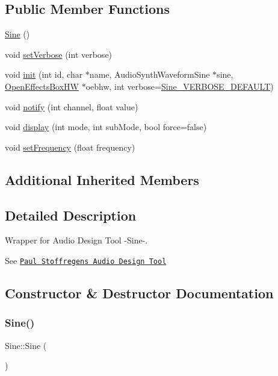 \subsection*{Public Member Functions}
\begin{DoxyCompactItemize}
\item 
\mbox{\hyperlink{class_sine_ac6f77168f7f50d200dc4b2d222c00608}{Sine}} ()
\item 
void \mbox{\hyperlink{class_sine_a84981bef49077a86ec953298d9e3e1d1}{set\+Verbose}} (int verbose)
\item 
void \mbox{\hyperlink{class_sine_a14a59e91ed90f357c3d28bd9f0433ddb}{init}} (int id, char $\ast$name, Audio\+Synth\+Waveform\+Sine $\ast$sine, \mbox{\hyperlink{class_open_effects_box_h_w}{Open\+Effects\+Box\+HW}} $\ast$oebhw, int verbose=\mbox{\hyperlink{_sine_8h_a368eacda00e5651e3e1243efe524c54d}{Sine\+\_\+\+V\+E\+R\+B\+O\+S\+E\+\_\+\+D\+E\+F\+A\+U\+LT}})
\item 
void \mbox{\hyperlink{class_sine_a91e8327318758647ea3e0f856eb3eb60}{notify}} (int channel, float value)
\item 
void \mbox{\hyperlink{class_sine_a1fcdbe7a2ac18201dfc30cb1dca0b3b3}{display}} (int mode, int sub\+Mode, bool force=false)
\item 
void \mbox{\hyperlink{class_sine_a9a82b09716b1f52440162af589f3fc56}{set\+Frequency}} (float frequency)
\end{DoxyCompactItemize}
\subsection*{Additional Inherited Members}


\subsection{Detailed Description}
Wrapper for Audio Design Tool -\/\+Sine-\/. 

See \href{https://www.pjrc.com/teensy/gui/}{\tt Paul Stoffregen\textquotesingle{}s Audio Design Tool} 

\subsection{Constructor \& Destructor Documentation}
\mbox{\label{class_sine_ac6f77168f7f50d200dc4b2d222c00608}} 
\subsubsection{\texorpdfstring{Sine()}{Sine()}}
{\footnotesize\ttfamily Sine\+::\+Sine (\begin{DoxyParamCaption}{ }\end{DoxyParamCaption})}



